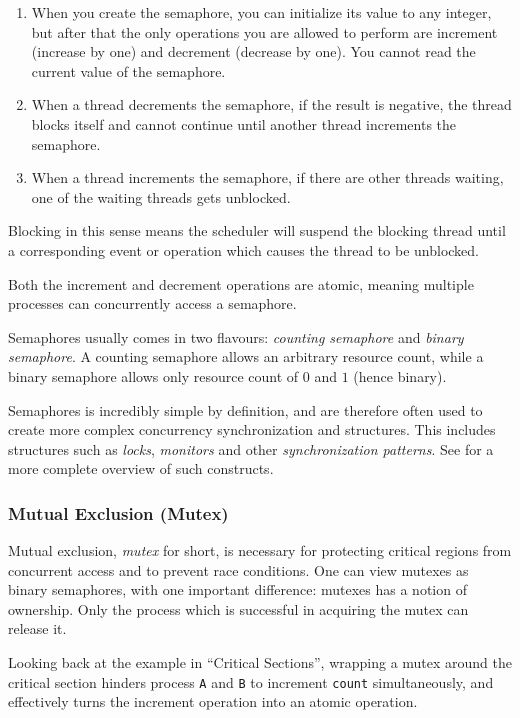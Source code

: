 \begin{enumerate}[topsep=0em,itemsep=-1em,partopsep=0.5em,parsep=1em]
    \item When you create the semaphore, you can initialize its value to any integer, but after that the only operations you are allowed to perform are increment (increase by one) and decrement (decrease by one). You cannot read the current value of the semaphore.
    \item When a thread decrements the semaphore, if the result is negative, the thread blocks itself and cannot continue until another thread increments the semaphore.
    \item When a thread increments the semaphore, if there are other threads waiting, one of the waiting threads gets unblocked.
\end{enumerate}

Blocking in this sense means the scheduler will suspend the blocking thread until a corresponding event or operation which causes the thread to be unblocked. 

Both the increment and decrement operations are atomic, meaning multiple processes can concurrently access a semaphore.

Semaphores usually comes in two flavours: \textit{counting semaphore} and \textit{binary semaphore}. A counting semaphore allows an arbitrary resource count, while a binary semaphore allows only resource count of $0$ and $1$ (hence binary). 

Semaphores is incredibly simple by definition, and are therefore often used to create more complex concurrency synchronization and structures. This includes structures such as \textit{locks}, \textit{monitors} and other \textit{synchronization patterns}. See \citet[chap. 3-7]{downey2016} for a more complete overview of such constructs.


\subsubsection{Mutual Exclusion (Mutex)}

Mutual exclusion, \textit{mutex} for short, is necessary for protecting critical regions from concurrent access and to prevent race conditions. One can view mutexes as binary semaphores, with one important difference: mutexes has a notion of ownership. Only the process which is successful in acquiring the mutex can release it. 

Looking back at the example in ``Critical Sections'', wrapping a mutex around the critical section hinders process \texttt{A} and \texttt{B} to increment \texttt{count} simultaneously, and effectively turns the increment operation into an atomic operation. 

